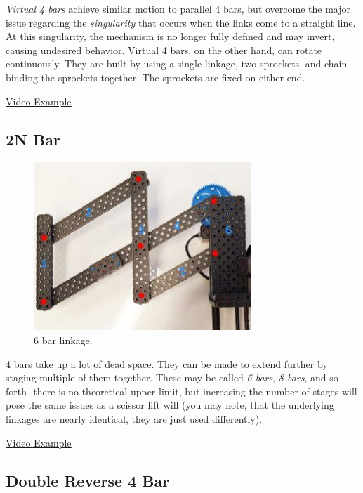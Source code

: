 \textit{Virtual 4 bars} achieve similar motion to parallel 4 bars, but overcome the major issue regarding the \textit{singularity} that occurs when the links come to a straight line. At this singularity, the mechanism is no longer fully defined and may invert, causing undesired behavior. Virtual 4 bars, on the other hand, can rotate continuously. They are built by using a single linkage, two sprockets, and chain binding the sprockets together. The sprockets are fixed on either end.

\href{https://www.youtube.com/watch?v=nH6P4BcwtiE}{\color{red}\underline{Video Example}}

\subsection{2N Bar}

\begin{figure}[H]
	\includegraphics[height=2.5in]{imgs/6bar.jpeg}
	\caption{6 bar linkage.}
\end{figure}

4 bars take up a lot of dead space. They can be made to extend further by staging multiple of them together. These may be called \textit{6 bars}, \textit{8 bars}, and so forth- there is no theoretical upper limit, but increasing the number of stages will pose the same issues as a scissor lift will (you may note, that the underlying linkages are nearly identical, they are just used differently).

\href{https://www.youtube.com/watch?v=twwNv4easgk}{\color{red}\underline{Video Example}}

\subsection{Double Reverse 4 Bar}


